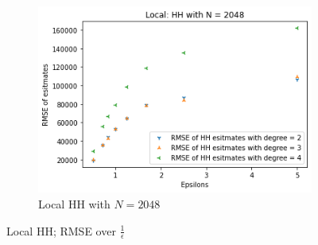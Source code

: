 \documentclass[11pt]{article}
\theoremstyle{definition}
\begin{document}
\begin{figure}[H]
\begin{subfigure}[b]{0.3\textwidth}
         \includegraphics[width=\textwidth]{figures/hh_loc_epsi/hh_1_N=2048.png}
         \caption{Local HH with $N=2048$}
         \label{fig:f1}
     \end{subfigure}
        \caption{Local HH; RMSE over $\frac{1}{\epsilon}$}
        \label{fig:esp_loc_hh1}
\end{figure}
\end{document}
